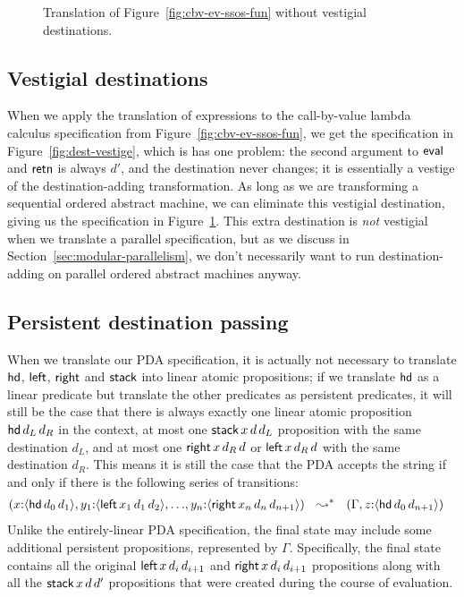 \begin{figure}
\caption{Translation of Figure~\ref{fig:cbv-ev-ssos-fun} without vestigial destinations.}
\label{fig:dest-cbv}
\end{figure}



\subsection{Vestigial destinations}

When we apply the translation of expressions to the call-by-value
lambda calculus specification from Figure~\ref{fig:cbv-ev-ssos-fun},
we get the specification in Figure~\ref{fig:dest-vestige}, which is
has one problem: the second argument to ${\sf eval}$ and ${\sf retn}$
is always $d'$, and the destination never changes; it is essentially a
vestige of the destination-adding transformation. As long as we are
transforming a sequential ordered abstract machine, we can eliminate
this vestigial destination, giving us the specification in
Figure~\ref{fig:dest-cbv}. This extra destination is {\it not}
vestigial when we translate a parallel specification, but as we
discuss in Section~\ref{sec:modular-parallelism}, we don't necessarily
want to run destination-adding on parallel ordered abstract machines
anyway.

\subsection{Persistent destination passing}
\label{sec:persistentdestpass}

When we translate our PDA specification, it is actually not necessary
to translate ${\sf hd}$, ${\sf left}$, ${\sf right}$ and ${\sf stack}$ into
linear atomic propositions; if we translate ${\sf hd}$ as
a linear predicate but translate the other predicates as persistent
predicates, it will still be the case that there is always exactly one
linear atomic proposition ${\sf hd}\,d_L\,d_R$ in the context, at most one
${\sf stack}\,x\,d\,d_L$ proposition with the same destination $d_L$, 
and at most one ${\sf right}\,x\,d_R\,d$ or ${\sf left}\,x\,d_R\,d$ 
with the same destination $d_R$. This means it is still the case that the
PDA accepts the string if and only if there is the following series of 
transitions:
\begin{align*}
(    x{:}\susp{{\sf hd}\,d_0\,d_1}, 
    y_1{:}\susp{{\sf left}\,x_1\,d_1\,d_2},
    \ldots&,
    y_n{:}\susp{{\sf right}\,x_n\,d_n\,d_{n+1}})%
~~ \leadsto^* ~~
(\Gamma, z{:}\susp{{\sf hd}\,d_0\,d_{n+1}})%
\end{align*}
Unlike the entirely-linear PDA specification, the final state may include
some additional 
persistent propositions, represented by $\Gamma$. Specifically, the final state
contains all the original ${\sf left}\,x\,d_i\,d_{i+1}$ and
${\sf right}\,x\,d_i\,d_{i+1}$ propositions 
along with all the ${\sf stack}\,x\,d\,d'$ propositions that were created
during the course of evaluation.

